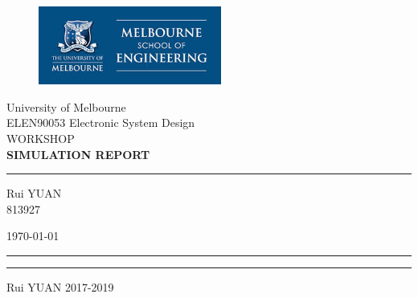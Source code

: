 \documentclass[pdftex,12pt,a4paper]{article}
\begin{document}
\graphicspath{{./figs/}}
\begin{titlepage}
\begin{center}
\begin{figure}[H]
      \includegraphics[width=6cm]{logo.png}
    \end{figure}
	
	
	{\color[RGB]{0,0,128} {\huge University of Melbourne}\\[0.5\baselineskip] %
		{\Huge ELEN90053 Electronic System Design  }\\[0.5\baselineskip] %
		{\Huge WORKSHOP}}\\ %
\vspace{0.05\textheight} %
\huge \bfseries SIMULATION REPORT
\rule{\textwidth}{1pt} %
\vspace{0.02\textheight} %
\begin{flushright} \large
Rui \textsc{YUAN}\\
813927 \\
\end{flushright}
\vfill
\begin{flushright} \large
{\large \today}
\end{flushright}
\rule{\textwidth}{0.4pt} %
	
	\vspace{2pt}\vspace{-\baselineskip} %
	
	\rule{\textwidth}{1pt} %
\begin{flushright} \tiny
{\scriptsize  \textcopyright \quad Rui YUAN 2017-2019}
\end{flushright}
\end{center}
\end{titlepage}
\tableofcontents
\newpage
\end{document}
